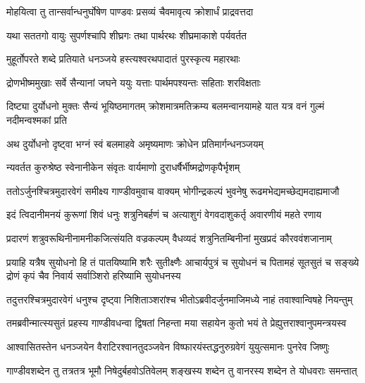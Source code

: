 
\twolineshloka
{मोहयित्वा तु तान्सर्वान्धनुर्घोषेण पाण्डवः}
{प्रसव्यं चैवमावृत्य क्रोशार्धं प्राद्रवत्तदा}


\twolineshloka
{यथा सततगो वायुः सुपर्णश्चापि शीघ्रगः}
{तथा पार्थरथः शीघ्रमाकाशे पर्यवर्तत}


\twolineshloka
{मुहूर्तोपरते शब्दे प्रतियाते धनञ्जये}
{हस्त्यश्वरथपादातं पुरस्कृत्य महारथाः}


\twolineshloka
{द्रोणभीष्ममुखाः सर्वे सैन्यानां जघने ययुः}
{यत्ताः पार्थमपश्यन्तः सहिताः शरविक्षताः}




\threelineshloka
{दिष्ट्या दुर्योधनो मुक्तः सैन्यं भूयिष्ठमागतम्}
{क्रोशमात्रमतिक्रम्य बलमन्वानयामहे}
{यात यत्र वनं गुल्मं नदीमन्वश्मकां प्रति}



\twolineshloka
{अथ दुर्योधनो दृष्ट्वा भग्नं स्वं बलमाहवे}
{अमृष्यमाणः क्रोधेन प्रतिमार्गन्धनञ्जयम्}


\twolineshloka
{न्यवर्तत कुरुश्रेष्ठ स्वेनानीकेन संवृतः}
{वार्यमाणो दुराधर्षैर्भीष्मद्रोणकृपैर्भृशम्}


\twolineshloka
{ततोऽर्जुनश्चित्रमुदारवेगं समीक्ष्य गाण्डीवमुवाच वाक्यम्}
{भोगीन्द्रकल्पं भुवनेषु रूढमभेद्यमच्छेद्यमदाह्यमाजौ}


\twolineshloka
{इदं त्विदानीमनयं कुरूणां शिवं धनुः शत्रुनिबर्हणं च}
{अत्याशुगं वेगवदाशुकर्तृ अवारणीयं महते रणाय}


\twolineshloka
{प्रदारणं शत्रुवरूथिनीनामनीकजित्संयति वज्रकल्पम्}
{वैधव्यदं शत्रुनितम्बिनीनां मुखप्रदं कौरववंशजानाम्}


\threelineshloka
{प्रयाहि यत्रैष सुयोधनो हि तं पातयिष्यामि शरैः सुतीक्ष्णैः}
{आचार्यपुत्रं च सुयोधनं च पितामहं सूतसुतं च सङ्ख्ये}
{द्रोणं कृपं चैव निवार्य सर्वाञ्शिरो हरिष्यामि सुयोधनस्य}



\twolineshloka
{तदुत्तरश्चित्रमुदारवेगं धनुश्च दृष्ट्वा निशिताञ्शरांश्च}
{भीतोऽब्रवीदर्जुनमाजिमध्ये नाहं तवाश्वान्विषहे नियन्तुम्}


\twolineshloka
{तमब्रवीन्मात्स्यसुतं प्रहस्य गाण्डीवधन्वा द्विषतां निहन्ता}
{मया सहायेन कुतो भयं ते प्रेह्युत्तराश्वानुपमन्त्रयस्व}


\twolineshloka
{आश्वासितस्तेन धनञ्जयेन वैराटिरश्वानतुदञ्जवेन}
{विष्फारयंस्तद्धनुरुग्रवेगं युयुत्समानः पुनरेव जिष्णुः}


\twolineshloka
{गाण्डीवशब्देन तु तत्रतत्र भूमौ निषेदुर्बहवोऽतिवेलम्}
{शङ्खस्य शब्देन तु वानरस्य शब्देन ते योधवराः समन्तात्}

